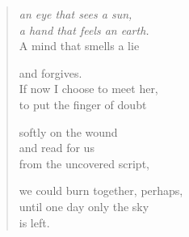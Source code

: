 {\begin{verse}
\emph{an eye that sees a sun,\\
a hand that feels an earth.}\label{schop-die-welt}\\
A mind that smells a lie

and forgives.\\
If now I choose to meet her,\\
to put the finger of doubt

softly on the wound\\
and read for us\\
from the uncovered script,

we could burn together, perhaps,\\
until one day only the sky\\
is left.

\end{verse}

}

